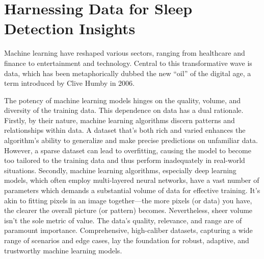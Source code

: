 \documentclass[
  10pt,
]{scrbook}
\let\originaltextbf\textbf
\renewcommand{\textbf}[1]{\textcolor{color1}{\textsf{\originaltextbf{#1}}}}
\begin{document}
\hypertarget{harnessing-data-for-sleep-detection-insights}{%
\section{\texorpdfstring{\textbf{Harnessing Data for Sleep Detection
Insights}}{Harnessing Data for Sleep Detection Insights}}\label{harnessing-data-for-sleep-detection-insights}}

Machine learning have reshaped various sectors, ranging from healthcare
and finance to entertainment and technology. Central to this
transformative wave is data, which has been metaphorically dubbed the
new ``oil'' of the digital age, a term introduced by Clive Humby in
2006.

The potency of machine learning models hinges on the quality, volume,
and diversity of the training data. This dependence on data has a dual
rationale. Firstly, by their nature, machine learning algorithms discern
patterns and relationships within data. A dataset that's both rich and
varied enhances the algorithm's ability to generalize and make precise
predictions on unfamiliar data. However, a sparse dataset can lead to
overfitting, causing the model to become too tailored to the training
data and thus perform inadequately in real-world situations. Secondly,
machine learning algorithms, especially deep learning models, which
often employ multi-layered neural networks, have a vast number of
parameters which demands a substantial volume of data for effective
training. It's akin to fitting pixels in an image together---the more
pixels (or data) you have, the clearer the overall picture (or pattern)
becomes. Nevertheless, sheer volume isn't the sole metric of value. The
data's quality, relevance, and range are of paramount importance.
Comprehensive, high-caliber datasets, capturing a wide range of
scenarios and edge cases, lay the foundation for robust, adaptive, and
trustworthy machine learning models.
\end{document}
